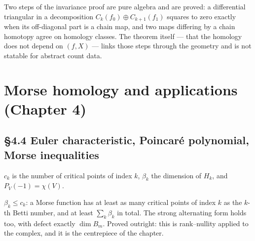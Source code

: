 \begin{theorem}
  \label{thm:3.4.2}
  \leanok
  Two steps of the invariance proof are pure algebra and are proved: a
  differential triangular in a decomposition $C_k(f_0)\oplus C_{k+1}(f_1)$
  squares to zero exactly when its off-diagonal part is a chain map, and two
  maps differing by a chain homotopy agree on homology classes.
  The theorem itself --- that the homology does not depend on $(f,X)$ --- links
  those steps through the geometry and is not statable for abstract count data.
\end{theorem}

\chapter{Morse homology and applications (Chapter 4)}

\section{\S4.4 Euler characteristic, Poincar\'e polynomial, Morse inequalities}

\begin{definition}
  \label{def:4.4}
  \leanok
  $c_k$ is the number of critical points of index $k$, $\beta_k$ the dimension of
  $H_k$, and $P_V(-1) = \chi(V)$.
\end{definition}

\begin{proposition}
  \label{prop:4.4.3}
  \leanok
  $\beta_k \le c_k$: a Morse function has at least as many critical points of
  index $k$ as the $k$-th Betti number, and at least $\sum_k \beta_k$ in total.
  The strong alternating form holds too, with defect exactly $\dim B_m$.
  Proved outright: this is rank--nullity applied to the complex, and it is the
  centrepiece of the chapter.
\end{proposition}

